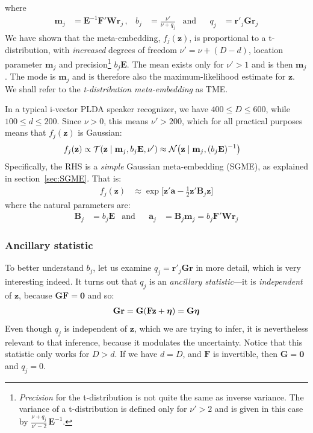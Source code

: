 \documentclass[a4paper,oneside,12pt,english]{report}
\def\zvec{\mathbf{z}}
\def\ND{\mathcal{N}}
\def\Bmat{\mathbf{B}}
\def\Wmat{\mathbf{W}}
\def\Fmat{\mathbf{F}}
\def\Gmat{\mathbf{G}}
\def\Emat{\mathbf{E}}
\def\Gmat{\mathbf{G}}
\def\mvec{\mathbf{m}}
\def\rvec{\mathbf{r}}
\def\avec{\mathbf{a}}
\def\nulvec{\boldsymbol{0}}
\begin{document}
where
\begin{align}
\label{eq:mu_and_E}
\mvec_j &= \Emat^{-1}\Fmat'\Wmat\rvec_j\,, & b_j&=\frac{\nu'}{\nu+q_j}& \text{and} &&
q_j &= \rvec'_j\Gmat\rvec_j
\end{align}
We have shown that the meta-embedding, $f_j(\zvec)$, is proportional to a t-distribution, with \emph{increased} degrees of freedom $\nu'=\nu+(D-d)$, location parameter $\mvec_j$ and precision\footnote{\emph{Precision} for the t-distribution is not quite the same as inverse variance. The variance of a t-distribution is defined only for $\nu'>2$ and is given in this case by $\frac{\nu+q_j}{\nu'-2}\,\Emat^{-1}$.} $b_j\Emat$. The mean exists only for $\nu'>1$ and is then $\mvec_j$. The mode is $\mvec_j$ and is therefore also the maximum-likelihood estimate for $\zvec$. We shall refer to the \emph{t-distribution meta-embedding} as TME.

In a typical i-vector PLDA speaker recognizer, we have $400\le D\le 600$, while $100\le d \le 200$. Since $\nu>0$, this means $\nu'>200$, which for all practical purposes means that $f_j(\zvec)$ is Gaussian:
\begin{align}
\label{eq:TMEvsGME}
f_j(\zvec) &\propto \TD(\zvec\mid \mvec_j,b_j\Emat,\nu')
\approx \ND\bigl(\zvec\mid\mvec_j,(b_j\Emat)^{-1}\bigr)
\end{align}
Specifically, the RHS is a \emph{simple} Gaussian meta-embedding (SGME), as explained in section~\ref{sec:SGME}. That is:
\begin{align}
f_j(\zvec) &\approx \exp\bigl[\zvec'\avec -\frac12\zvec'\Bmat_j\zvec\bigr]
\end{align}
where the natural parameters are:
\begin{align}
\label{eq:TSGME_params}
\Bmat_j &= b_j\Emat &\text{and} &&
\avec_j &= \Bmat_j\mvec_j = b_j\Fmat'\Wmat\rvec_j
\end{align}


\subsubsection{Ancillary statistic}
To better understand $b_j$, let us examine $q_j=\rvec'_j\Gmat\rvec$ in more detail, which is very interesting indeed. It turns out that $q_j$ is an \emph{ancillary statistic}---it is \emph{independent} of $\zvec$, because $\Gmat\Fmat=\nulvec$ and so: 
\begin{align}
\Gmat\rvec=\Gmat(\Fmat\zvec+\etavec)=\Gmat\etavec
\end{align}
Even though $q_j$ is independent of $\zvec$, which we are trying to infer, it is nevertheless relevant to that inference, because it modulates the uncertainty. Notice that this statistic only works for $D> d$. If we have $d=D$, and $\Fmat$ is invertible, then $\Gmat=\nulvec$ and $q_j=0$.
\end{document}
